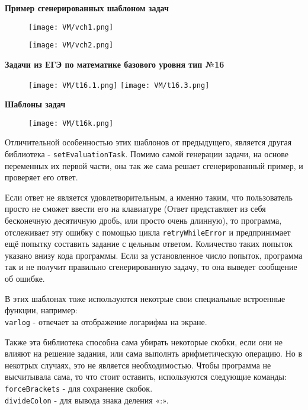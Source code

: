 \textbf{ Пример сгенерированных шаблоном задач}

 	\begin{figure}[h]
		\centering
		\texttt{[image: VM/vch1.png]}
		 		\end{figure}
		 	\begin{figure}[h]
		\centering
		\texttt{[image: VM/vch2.png]}
	\end{figure}

\textbf{Задачи из ЕГЭ по математике базового уровня тип №16}
	\begin{figure}[h]
		\centering
		\texttt{[image: VM/t16.1.png]}
		\texttt{[image: VM/t16.3.png]}
	\end{figure}
	
\textbf{Шаблоны задач}
\\
\begin{figure}[h]
		\centering
		\texttt{[image: VM/t16k.png]}
	\end{figure}
	
Отличительной особенностью этих шаблонов от предыдущего, является другая библиотека - \texttt{setEvaluationTask}. Помимо самой генерации задачи, на основе переменных их первой части, она так же сама решает сгенерированный пример, и проверяет его ответ. 

Если ответ не является удовлетворительным, а именно таким, что пользователь просто не сможет ввести его на клавиатуре (Ответ представляет из себя бесконечную десятичную дробь, или просто очень длинную), то программа, отслеживает эту ошибку с помощью цикла \texttt{retryWhileError} и предпринимает ещё попытку составить задание с цельным ответом. Количество таких попыток указано внизу кода программы. Если за установленное число попыток, программа так и не получит правильно сгенерированную задачу, то она выведет сообщение об ошибке.

В этих шаблонах тоже используются некотрые свои специальные встроенные функции, например:
\\ \texttt{varlog} - отвечает за отображение логарифма на экране.

Также эта библиотека способна сама убирать некоторые скобки, если они не влияют на решение задания, или сама выполнть арифметическую операцию. Но в некотрых случаях, это не является необходимостью. Чтобы программа не высчитывала сама, то что стоит оставить, используются следующие команды:
\\ \texttt{forceBrackets} - для сохранение скобок.
\\ \texttt{divideColon} - для вывода знака деления «:».

